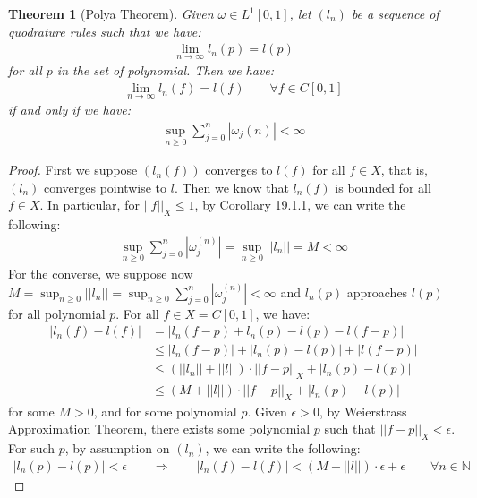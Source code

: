 \documentclass[11pt]{book}
\theoremstyle{break}
\theoremstyle{break}
\newtheorem{thm}{Theorem}[section]
\newcommand{\N}{\mathbb{N}}
\begin{document}
\begin{thm}[Polya Theorem]
Given $\omega \in L^1[0,1]$, let $(l_n)$ be a sequence of quodrature rules such that we have:
\begin{align*}
\lim_{n\to \infty}l_n(p) = l(p) 
\end{align*}
for all $p$ in the set of polynomial. Then we have:
\begin{align*}
\lim_{n\to \infty} l_n(f) = l(f) \qquad \forall f \in C[0,1]
\end{align*}
if and only if we have:
\begin{align*}
\sup_{n\geq 0} \sum_{j=0}^n |\omega_j{(n)}| < \infty 
\end{align*}
\end{thm}
\begin{proof}
First we suppose $(l_n(f) ) $ converges to $l(f)$ for all $f \in X$, that is, $(l_n)$ converges pointwise to $l$. Then we know that $l_n(f)$ is bounded for all $f \in X$. In particular, for $||f||_X \leq 1$, by Corollary 19.1.1, we can write the following:
\begin{align*}
\sup_{n\geq 0}\sum_{j=0}^n |\omega_j^{(n)}| = \sup_{n \geq 0}||l_n|| = M < \infty
\end{align*}
For the converse, we suppose now $M = \sup_{n \geq 0}||l_n|| = \sup_{n\geq 0}\sum_{j=0}^n |\omega_j^{(n)}| < \infty$ and $l_n(p)$ approaches $l(p)$ for all polynomial $p$. For all $f \in X= C[0,1]$, we have:
\begin{align*}
|l_n(f) - l(f) | &= |l_n(f-p) + l_n(p) - l(p) - l(f-p)| \\
&\leq |l_n(f-p)| + |l_n(p) - l(p)| + |l(f-p)|\\
&\leq \left(||l_n|| + ||l||\right)\cdot ||f-p||_X + |l_n(p) - l(p)|\\
&\leq \left(M +||l||\right)\cdot ||f-p||_X + |l_n(p) - l(p)|
\end{align*}
for some $M>0$, and for some polynomial $p$. Given $\epsilon>0$, by Weierstrass Approximation Theorem, there exists some polynomial $p$ such that $||f - p||_X <\epsilon$. For such $p$, by assumption on $(l_n)$, we can write the following:
\begin{align*}
|l_n(p) - l(p)| < \epsilon \qquad \Rightarrow \qquad |l_n(f) - l(f)| < (M+||l||) \cdot \epsilon + \epsilon \qquad\forall n \in \N
\end{align*} 
\end{proof}
\end{document}
